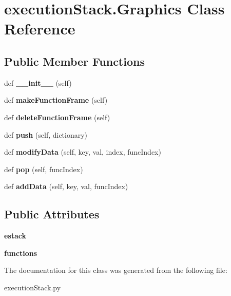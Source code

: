 \hypertarget{classexecution_stack_1_1_graphics}{}\section{execution\+Stack.\+Graphics Class Reference}
\label{classexecution_stack_1_1_graphics}
\subsection*{Public Member Functions}
\begin{DoxyCompactItemize}
\item 
\mbox{\label{classexecution_stack_1_1_graphics_acf9ace0155ce0c9f9865ed83ad834ece}} 
def {\bfseries \+\_\+\+\_\+init\+\_\+\+\_\+} (self)
\item 
\mbox{\label{classexecution_stack_1_1_graphics_ae2d3817297524a7f62cdb500501bd33f}} 
def {\bfseries make\+Function\+Frame} (self)
\item 
\mbox{\label{classexecution_stack_1_1_graphics_a8da37c457e222b7f131f4c25acd08c56}} 
def {\bfseries delete\+Function\+Frame} (self)
\item 
\mbox{\label{classexecution_stack_1_1_graphics_a455991c3f35dc6c47973a8183f3a06e4}} 
def {\bfseries push} (self, dictionary)
\item 
\mbox{\label{classexecution_stack_1_1_graphics_a5b793f6f5577abbfdec7b202875db391}} 
def {\bfseries modify\+Data} (self, key, val, index, func\+Index)
\item 
\mbox{\label{classexecution_stack_1_1_graphics_a41ccb4664ceb5e47707c6849454e7324}} 
def {\bfseries pop} (self, func\+Index)
\item 
\mbox{\label{classexecution_stack_1_1_graphics_a02a8347895b7cbb48506e29dfd12f56a}} 
def {\bfseries add\+Data} (self, key, val, func\+Index)
\end{DoxyCompactItemize}
\subsection*{Public Attributes}
\begin{DoxyCompactItemize}
\item 
\mbox{\label{classexecution_stack_1_1_graphics_a8cb32cead44e14bef2b68ce5d5b4a775}} 
{\bfseries estack}
\item 
\mbox{\label{classexecution_stack_1_1_graphics_a7390c53c977fb6f992bbd59d106a014d}} 
{\bfseries functions}
\end{DoxyCompactItemize}


The documentation for this class was generated from the following file\+:\begin{DoxyCompactItemize}
\item 
execution\+Stack.\+py\end{DoxyCompactItemize}
